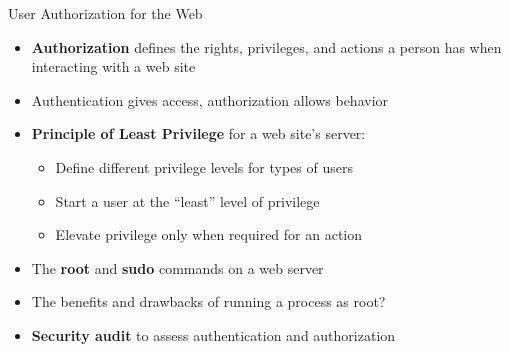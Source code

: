 \documentclass[14pt,aspectratio=169]{beamer}
\begin{document}
%
\begin{frame}{User Authorization for the Web}
  \begin{itemize}
    \item {\bf Authorization} defines the rights, privileges, and actions a
      person has when interacting with a web site
      \vspace*{-.15in}
    \item Authentication gives access, authorization allows behavior
      \vspace*{-.15in}
    \item {\bf Principle of Least Privilege} for a web site's server:
      \begin{itemize}
        \item Define different privilege levels for types of users
        \item Start a user at the ``least'' level of privilege
        \item Elevate privilege only when required for an action
      \end{itemize}
      \vspace*{-.25in}
    \item The {\bf root} and {\bf sudo} commands on a web server
      \vspace*{-.25in}
    \item The benefits and drawbacks of running a process as root?
      \vspace*{-.25in}
    \item {\bf Security audit} to assess authentication and authorization
  \end{itemize}
\end{frame}
\end{document}
